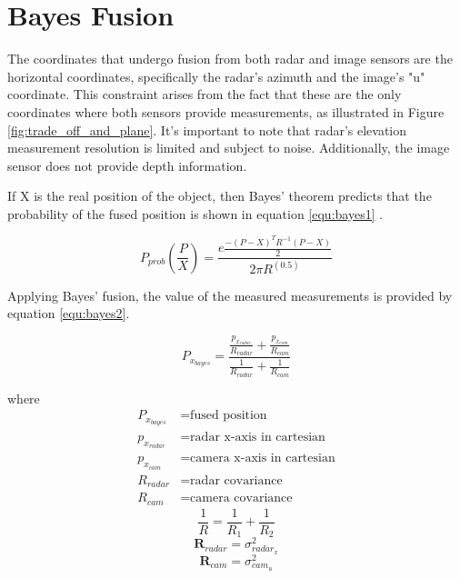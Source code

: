 \section{Bayes Fusion}\label{sec:2-bayes_fusion}

The coordinates that undergo fusion from both radar and image sensors are the horizontal coordinates,
specifically the radar's azimuth and the image's "u" coordinate. 
This constraint arises from the fact that these are the only coordinates where both sensors provide measurements, 
as illustrated in Figure \ref{fig:trade_off_and_plane}.
It's important to note that radar's elevation measurement resolution is limited and subject to noise. 
Additionally, the image sensor does not provide depth information.

If X is the real position of the object, 
then Bayes' theorem predicts that the probability of the fused position is shown in equation \ref{equ:bayes1} \cite{10.1007/978-981-16-2248-9_32}.

\begin{equation}\label{equ:bayes1}
    P_{prob}(\frac{P}{X})=
    \frac
    {e \frac{−(P−X)^T R^{−1}(P−X)}{2}}
    {2 \pi R^(0.5)}
\end{equation}

Applying Bayes' fusion, the value of the measured measurements is provided by equation \ref{equ:bayes2}.

\begingroup
\Large
\begin{equation}\label{equ:bayes2}
P_{x_{bayes}}=\frac
{\frac{p_{x_{radar}}}{R_{radar}}+\frac{p_{x_{cam}}} {R_{cam}}}
{\frac{1}{R_{radar}}+\frac{1}{R_{cam}}}
\end{equation}
\endgroup

where
\begin{align*}
    P_{x_{bayes}} &= \text{fused position}\\
    p_{x_{radar}} &= \text{radar x-axis in cartesian}\\
    p_{x_{cam}} &= \text{camera x-axis in cartesian}\\
    R_{radar} &= \text{radar covariance}\\
    R_{cam} &= \text{camera covariance}
\end{align*}
\begin{equation}\label{equ:bayes4}
    \frac{1}{R}=\frac{1}{R_1}+\frac{1}{R_2}
\end{equation}
\begin{equation}\label{equ:2-radar_R}
    \mathbf{R}_{radar} = 
        \sigma_{radar_x}^2 
\end{equation}
\begin{equation}\label{equ:2-R_cam}
    \mathbf{R}_{cam} = 
        \sigma_{cam_u}^2
\end{equation}



